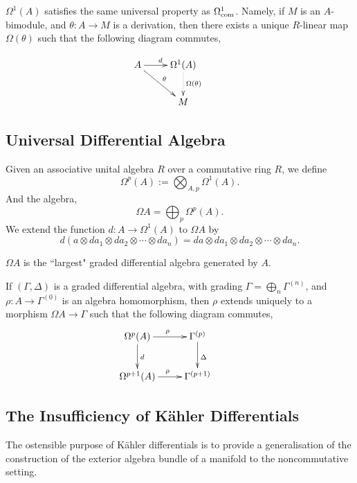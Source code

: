 $\Omega^1(A)$ satisfies the 
same universal property as $\Omega^1_{\operatorname{com}}$. Namely, if $M$ is an $A$-bimodule,
and $\theta:A\rightarrow M$ is a derivation, then there exists a unique $R$-linear
map $\Omega(\theta)$ such that the following diagram commutes,

    \begin{displaymath}
    \xymatrix{
        A \ar[r]^d \ar[rd]^\theta & 
        \Omega^1(A) \ar@{.>}[d]^{\Omega(\theta)} &\\
         &
        M
  } 
  \end{displaymath}
  
\subsection{Universal Differential Algebra}
Given an associative unital algebra $R$ over a commutative ring $R$,
we define
\begin{equation*}
    \Omega^p(A) := \bigotimes_{A,p} \Omega^1(A).
\end{equation*} 
And the algebra,
\begin{equation*}
    \Omega A = \bigoplus_{p} \Omega^p(A).
\end{equation*}
We extend the function $d:A\rightarrow \Omega^1(A)$ to $\Omega A$
by
\begin{equation*}
    d(a\otimes da_1\otimes da_2\otimes \cdots \otimes da_n) = da\otimes da_1\otimes da_2\otimes \cdots\otimes da_n.
\end{equation*}
 
\begin{theorem}
    $\Omega A$ is the ``largest" graded differential algebra generated by $A$. 
    
    If $(\Gamma,\Delta)$ is a graded differential algebra, with grading $\Gamma = \bigoplus_n \Gamma^{(n)}$,
    and $\rho:A\rightarrow \Gamma^{(0)}$ is an algebra homomorphism, then $\rho$
    extends uniquely to a morphism $\Omega A\rightarrow \Gamma$ such that the following
    diagram commutes,
    \begin{displaymath}
    \xymatrix{
        \Omega^p(A) \ar[r]^\rho \ar[d]^{d} & 
        \Gamma^{(p)} \ar[d]^\Delta&\\
        \Omega^{p+1}(A) \ar[r]^\rho & 
        \Gamma^{(p+1)}&
    }
    \end{displaymath}
\end{theorem}

\subsection{The Insufficiency of K\"ahler Differentials}
The ostensible purpose of K\"ahler differentials is to provide
a generalisation of the construction of the exterior algebra
bundle of a manifold to the noncommutative setting.


